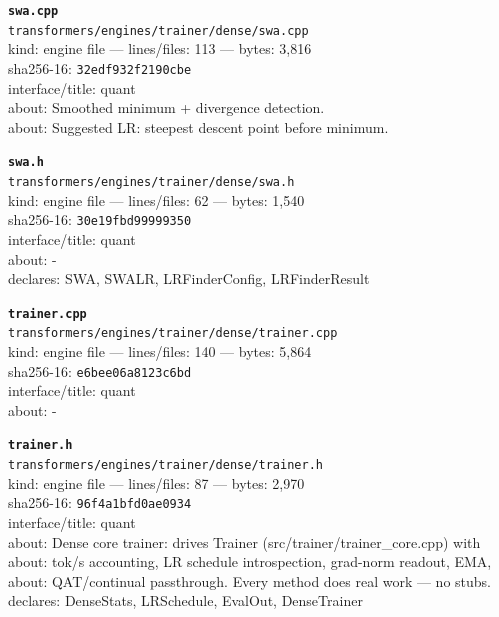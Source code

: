 \noindent\textbf{\texttt{swa.cpp}}\\
\texttt{transformers/engines/trainer/dense/swa.cpp}\\
kind: engine file --- lines/files: 113 --- bytes: 3,816\\
sha256-16: \texttt{32edf932f2190cbe}\\
interface/title: quant\\
about: Smoothed minimum + divergence detection.\\
about: Suggested LR: steepest descent point before minimum.\\
\vspace*{6.0pt}

\noindent\textbf{\texttt{swa.h}}\\
\texttt{transformers/engines/trainer/dense/swa.h}\\
kind: engine file --- lines/files: 62 --- bytes: 1,540\\
sha256-16: \texttt{30e19fbd99999350}\\
interface/title: quant\\
about: -\\
declares: SWA, SWALR, LRFinderConfig, LRFinderResult\\
\vspace*{6.0pt}
\newpage

\noindent\textbf{\texttt{trainer.cpp}}\\
\texttt{transformers/engines/trainer/dense/trainer.cpp}\\
kind: engine file --- lines/files: 140 --- bytes: 5,864\\
sha256-16: \texttt{e6bee06a8123c6bd}\\
interface/title: quant\\
about: -\\
\vspace*{6.0pt}

\noindent\textbf{\texttt{trainer.h}}\\
\texttt{transformers/engines/trainer/dense/trainer.h}\\
kind: engine file --- lines/files: 87 --- bytes: 2,970\\
sha256-16: \texttt{96f4a1bfd0ae0934}\\
interface/title: quant\\
about: Dense core trainer: drives Trainer (src/trainer/trainer\_core.cpp) with\\
about: tok/s accounting, LR schedule introspection, grad-norm readout, EMA,\\
about: QAT/continual passthrough. Every method does real work — no stubs.\\
declares: DenseStats, LRSchedule, EvalOut, DenseTrainer\\
\vspace*{6.0pt}

